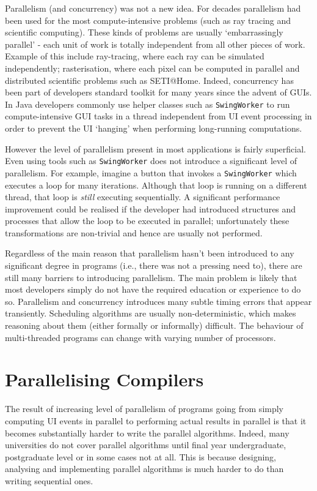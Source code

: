 Parallelism (and concurrency) was not a new idea. For decades parallelism had been used for the most compute-intensive problems (such as ray tracing and scientific computing). These kinds of problems are usually `embarrassingly parallel' - each unit of work is totally independent from all other pieces of work. Example of this include ray-tracing, where each ray can be simulated independently; rasterisation, where each pixel can be computed in parallel and distributed scientific problems such as SETI@Home. Indeed, concurrency has been part of developers standard toolkit for many years since the advent of GUIs. In Java developers commonly use helper classes such as \texttt{SwingWorker} to run compute-intensive GUI tasks in a thread independent from UI event processing in order to prevent the UI `hanging' when performing long-running computations.

However the level of parallelism present in most applications is fairly superficial. Even using tools such as \texttt{SwingWorker} does not introduce a significant level of parallelism. For example, imagine a button that invokes a \texttt{SwingWorker} which executes a loop for many iterations. Although that loop is running on a different thread, that loop is \textit{still} executing sequentially. A significant performance improvement could be realised if the developer had introduced structures and  processes that allow the loop to be executed in parallel; unfortunately these transformations are non-trivial and hence are usually not performed.

Regardless of the main reason that parallelism hasn't been introduced to any significant degree in programs (i.e., there was not a pressing need to), there are still many barriers to introducing parallelism. The main problem is likely that most developers simply do not have the required education or experience to do so. Parallelism and concurrency introduces many subtle timing errors that appear transiently. Scheduling algorithms are usually non-deterministic, which makes reasoning about them (either formally or informally) difficult. The behaviour of multi-threaded programs can change with varying number of processors.

\section{Parallelising Compilers} \label{sec:introduction/compilers}
The result of increasing level of parallelism of programs going from simply computing UI events in parallel to performing actual results in parallel is that it becomes substantially harder to write the parallel algorithms. Indeed, many universities do not cover parallel algorithms until final year undergraduate, postgraduate level or in some cases not at all. This is because designing, analysing and implementing parallel algorithms is much harder to do than writing sequential ones.

